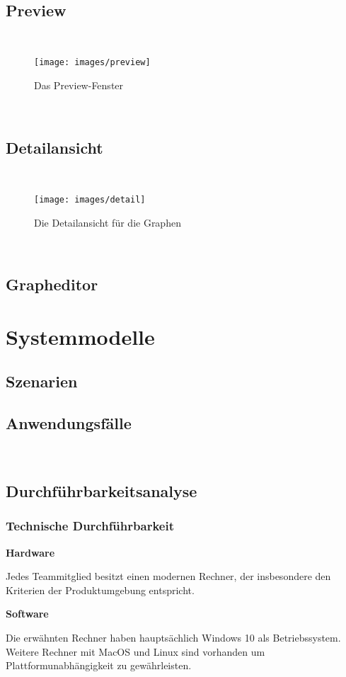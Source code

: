 \documentclass{article}
\begin{document}
	~\newpage
	\subsection{Preview}
	~\begin{figure}[!h]
		\centering
		\texttt{[image: images/preview]}
		\caption{Das Preview-Fenster}
	\end{figure}
	
	~\newpage
	\subsection{Detailansicht}
	~\begin{figure}[!h]
		\centering
		\texttt{[image: images/detail]}
		\caption{Die Detailansicht für die Graphen}
	\end{figure}
	
	~\newpage
	\subsection{Grapheditor}
	
	
	\section{Systemmodelle}
	\subsection{Szenarien}
	\subsection{Anwendungsfälle}
	
	~\newpage
	\subsection{Durchführbarkeitsanalyse}
	\subsubsection{Technische Durchführbarkeit}
	\textbf{Hardware}
	
	Jedes Teammitglied besitzt einen modernen Rechner, der insbesondere den Kriterien der Produktumgebung entspricht.
	\newline
	
	\textbf{Software}
	
	Die erwähnten Rechner haben hauptsächlich Windows 10 als Betriebssystem. Weitere Rechner mit MacOS und Linux sind vorhanden um Plattformunabhängigkeit zu gewährleisten.
	
\end{document}
